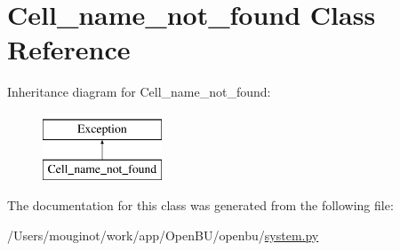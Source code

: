 \hypertarget{classopenbu_1_1system_1_1_cell__name__not__found}{}\section{Cell\+\_\+name\+\_\+not\+\_\+found Class Reference}
\label{classopenbu_1_1system_1_1_cell__name__not__found}
Inheritance diagram for Cell\+\_\+name\+\_\+not\+\_\+found\+:\begin{figure}[H]
\begin{center}
\leavevmode
\includegraphics[height=2.000000cm]{classopenbu_1_1system_1_1_cell__name__not__found}
\end{center}
\end{figure}


The documentation for this class was generated from the following file\+:\begin{DoxyCompactItemize}
\item 
/\+Users/mouginot/work/app/\+Open\+B\+U/openbu/\mbox{\hyperlink{system_8py}{system.\+py}}\end{DoxyCompactItemize}
